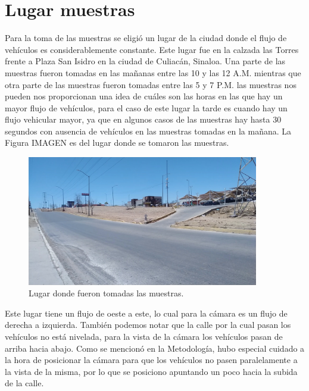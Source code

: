 \section{Lugar muestras}

Para la toma de las muestras se eligió un lugar de la ciudad donde el flujo de vehículos es considerablemente constante. Este lugar fue en la calzada las Torres frente a Plaza San Isidro en la ciudad de Culiacán, Sinaloa. Una parte de las muestras fueron tomadas en las mañanas entre las 10 y las 12 A.M. mientras que otra parte de las muestras fueron tomadas entre las 5 y 7 P.M. las muestras nos pueden nos proporcionan una idea de cuáles son las horas en las que hay un mayor flujo de vehículos, para el caso de este lugar la tarde es cuando hay un flujo vehicular mayor, ya que en algunos casos de las muestras hay hasta 30 segundos con ausencia de vehículos en las muestras tomadas en la mañana. La Figura IMAGEN es del lugar donde se tomaron las muestras.

\begin{figure}[H]
    \centering
    \includegraphics[width=0.9\textwidth]{Resultados/imgs/LugarMuestras.jpg}
    \caption{Lugar donde fueron tomadas las muestras.}
    \label{fig:LugarMuestras}
\end{figure}

Este lugar tiene un flujo de oeste a este, lo cual para la cámara es un flujo de derecha a izquierda. También podemos notar que la calle por la cual pasan los vehículos no está nivelada, para la vista de la cámara los vehículos pasan de arriba hacia abajo. Como se mencionó en la Metodología, hubo especial cuidado a la hora de posicionar la cámara para que los vehículos no pasen paralelamente a la vista de la misma, por lo que se posiciono apuntando un poco hacia la subida de la calle.
